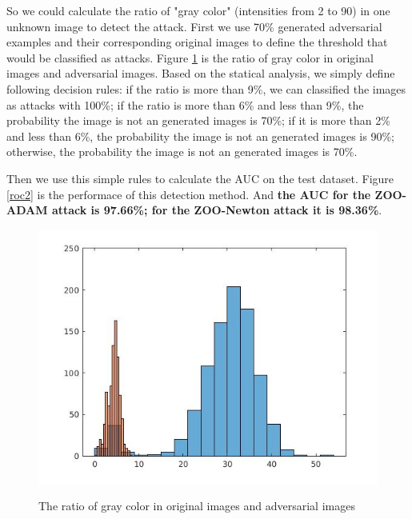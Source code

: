 \documentclass[a4paper]{article}
\begin{document}
So we could calculate the ratio of "gray color" (intensities from 2 to 90) in one unknown image to detect the attack.
First we use 70\% generated adversarial examples and their corresponding original images to define the threshold that would be classified as attacks. Figure \ref{freq3} is the ratio of gray color in original images and adversarial images. Based on the statical analysis, we simply define following decision rules: if the ratio is more than 9\%, we can classified the images as attacks with 100\%; if the ratio is more than 6\% and less than 9\%, the probability the image is not an generated images is 70\%; if it is more than 2\% and less than 6\%, the probability the image is not an generated images is 90\%; otherwise, the probability the image is not an generated images is 70\%.

Then we use this simple rules to calculate the AUC on the test dataset. Figure \ref{roc2} is the performace of this detection method.
And \textbf{the AUC for the ZOO-ADAM attack is 97.66\%; for the ZOO-Newton attack it is 98.36\%}.

\begin{figure}
\centering
\includegraphics[scale=0.5]{freq3.jpg}
\label{freq3}
\caption{The ratio of gray color in original images and adversarial images}
\end{figure}
\end{document}
